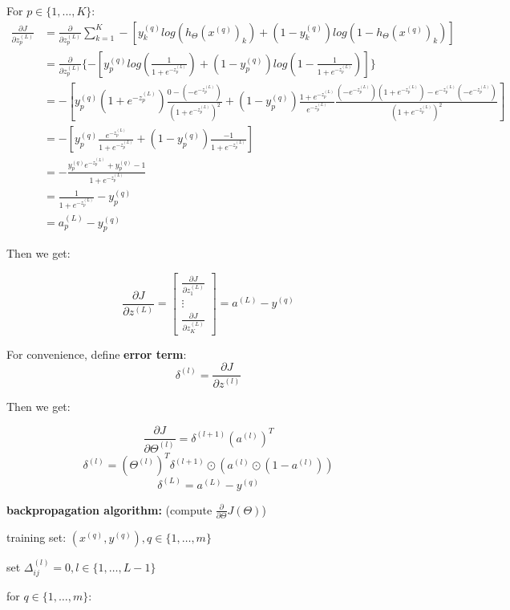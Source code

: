 \documentclass{article}
\begin{document}
For \(p \in \{1, ..., K\}\):
\begin{equation*}
\begin{split}
\frac{\partial J}{\partial z_p^{(L)}} 
& = \frac{\partial}{\partial z_p^{(L)}} \sum_{k = 1}^{K} -[y^{(q)}_k log(h_{\Theta} (x^{(q)})_k) + (1 - y^{(q)}_k) log(1 - h_{\Theta}(x^{(q)})_k)] \\
& = \frac{\partial}{\partial z_p^{(L)}} \{-[y^{(q)}_p log(\frac{1}{1 + e^{-z_p^{(L)}}}) + (1 - y^{(q)}_p) log(1 - \frac{1}{1 + e^{-z_p^{(L)}}})]\} \\
& = - [y^{(q)}_p (1 + e^{-z_p^{(L)}}) \frac{0 - (-e^{-z_p^{(L)}})}{(1 + e^{-z_p^{(L)}})^2} + (1 - y^{(q)}_p) \frac{1 + e^{-z_p^{(L)}}}{e^{-z_p^{(L)}}} \frac{(-e^{-z_p^{(L)}})(1 + e^{-z_p^{(L)}}) - e^{-z_p^{(L)}}(-e^{-z_p^{(L)}})}{(1 + e^{-z_p^{(L)}})^2}] \\
& = - [y_p^{(q)} \frac{e^{-z_p^{(L)}}}{1 + e^{-z_p^{(L)}}} + (1 - y_p^{(q)}) \frac{-1}{1 + e^{-z_p^{(L)}}}] \\
& = - \frac{y_p^{(q)}e^{-z_p^{(L)}} + y_p^{(q)} - 1}{1 + e^{-z_p^{(L)}}} \\
& = \frac{1}{1 + e^{-z_p^{(L)}}} - y_p^{(q)} \\ 
& = a_p^{(L)} - y_p^{(q)}
\end{split}
\end{equation*}

Then we get:

\[\frac{\partial J}{\partial z^{(L)}} = 
\begin{bmatrix}
\frac{\partial J}{\partial z_1^{(L)}} \\
\vdots \\
\frac{\partial J}{\partial z_K^{(L)}}
\end{bmatrix}
= a^{(L)} - y^{(q)}
\]

For convenience, define \textbf{error term}: 
\[\delta^{(l)} = \frac{\partial J}{\partial z^{(l)}}\]

Then we get:

\[\frac{\partial J}{\partial \Theta^{(l)}} = \delta^{(l + 1)} (a^{(l)})^T\]
\[\delta^{(l)} = (\Theta^{(l)})^T \delta^{(l + 1)} \odot (a^{(l)} \odot (1 - a^{(l)}))\]
\[\delta^{(L)} = a^{(L)} - y^{(q)}\]

\textbf{backpropagation algorithm:} (compute \(\frac{\partial}{\partial \Theta} J(\Theta)\))

training set: \((x^{(q)}, y^{(q)}), q \in \{1, \dots, m\}\)

set \(\Delta_{ij}^{(l)} = 0, l \in \{1, \dots, L - 1\}\)

for \(q \in \{1, \dots, m\}\):
\end{document}
